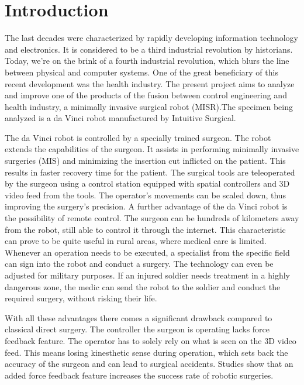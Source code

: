 
%
	
\chapter{Introduction}

The last decades were characterized by rapidly developing information technology and electronics. It is considered to be a third industrial revolution by historians. Today, we're on the brink of a fourth industrial revolution, which blurs the line between physical and computer systems. One of the great beneficiary of this recent development was the health industry. The present project aims to analyze and improve one of the products of the fusion between control engineering and health industry, a minimally invasive surgical robot (MISR).The specimen being analyzed is a da Vinci robot manufactured by Intuitive Surgical.

The da Vinci robot is controlled by a specially trained surgeon. The robot extends the capabilities of the surgeon. It assists in performing minimally invasive surgeries (MIS) and minimizing the insertion cut inflicted on the patient.
This results in faster recovery time for the patient. The surgical tools are teleoperated by the surgeon using a control station equipped with spatial controllers and 3D video feed from the tools. The operator's movements can be scaled down, thus improving the surgery's precision. A further advantage of the da Vinci robot is the possibility of remote control. The surgeon can be hundreds of kilometers away from the robot, still able to control it through the internet. This characteristic can prove to be quite useful in rural areas, where medical care is limited. Whenever an operation needs to be executed, a specialist from the specific field can sign into the robot and conduct a surgery. The technology can even be adjusted for military purposes. If an injured soldier needs treatment in a highly dangerous zone, the medic can send the robot to the soldier and conduct the required surgery, without risking their life.

With all these advantages there comes a significant drawback compared to classical direct surgery. The controller the surgeon is operating lacks force feedback feature. The operator has to solely rely on what is seen on the 3D video feed. This means losing kinesthetic sense during operation, which sets back the accuracy of the surgeon and can lead to surgical accidents. Studies show that an added force feedback feature increases the success rate of robotic surgeries.

